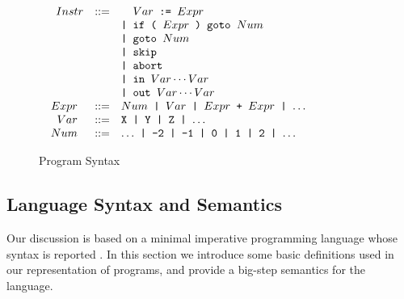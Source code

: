 
\begin{figure}[b]
\vspace{-2mm}
\centering
\begin{minipage}{0.63\textwidth}
\noindent
\begin{small}
$
\begin{array}{rcl}
\texttt{$Instr$} & ::= & \hphantom{\texttt{| }}\texttt{$Var$ := $Expr$} \\
& & \texttt{| if ( $Expr$ ) goto $Num$} \\
& & \texttt{| goto $Num$} \\
& & \texttt{| skip} \\
& & \texttt{| abort} \\
& & \texttt{| in $Var\cdots Var$} \\ 
& & \texttt{| out $Var\cdots Var$} \\
\texttt{ $Expr$ } & ::= & \texttt{$Num$ | $Var$ | $Expr$ + $Expr$ | $\ldots$ } \\
\texttt{ $Var$ } & ::= & \texttt{X | Y | Z | $\ldots$} \\
\texttt{ $Num$ } & ::= & \texttt{$\ldots$ | -2 | -1 | 0 | 1 | 2 | $\ldots$} \\
\end{array}
$
\end{small}
\end{minipage}
\caption{\label{fig:osr-program-syntax}Program Syntax}
\end{figure}

\subsection{Language Syntax and Semantics}
\label{ss:osr-language-framework}
Our discussion is based on a minimal imperative programming language whose syntax is reported . In this section we introduce some basic definitions used in our representation of programs, and provide a big-step semantics for the language.



